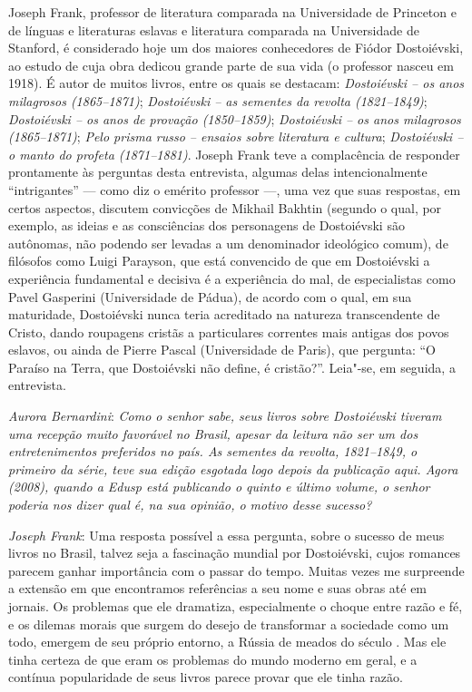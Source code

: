 



Joseph Frank, professor de literatura comparada na Universidade de
Princeton e de línguas e literaturas eslavas e literatura comparada na
Universidade de Stanford, é considerado hoje um dos maiores conhecedores
de Fiódor Dostoiévski, ao estudo de cuja obra dedicou grande parte de
sua vida (o professor nasceu em 1918). É autor de muitos livros, entre
os quais se destacam: \emph{Dostoiévski -- os anos milagrosos (1865--1871)}; \emph{Dostoiévski -- as sementes da revolta (1821--1849)}; \emph{Dostoiévski -- os anos de provação
(1850--1859)}; \emph{Dostoiévski -- os anos
milagrosos (1865--1871)}; \emph{Pelo prisma russo -- ensaios sobre literatura e cultura}; \emph{Dostoiévski -- o manto do
profeta (1871--1881)}. Joseph
Frank teve a complacência de responder prontamente às perguntas desta
entrevista, algumas delas intencionalmente ``intrigantes'' --- como diz o
emérito professor ---, uma vez que suas respostas, em certos aspectos,
discutem convicções de Mikhail Bakhtin (segundo o qual, por exemplo, as
ideias e as consciências dos personagens de Dostoiévski são autônomas,
não podendo ser levadas a um denominador ideológico comum), de filósofos
como Luigi Parayson, que está convencido de que em Dostoiévski a
experiência fundamental e decisiva é a experiência do mal, de
especialistas como Pavel Gasperini (Universidade de Pádua), de acordo
com o qual, em sua maturidade, Dostoiévski nunca teria acreditado na
natureza transcendente de Cristo, dando roupagens cristãs a particulares
correntes mais antigas dos povos eslavos, ou ainda de Pierre Pascal
(Universidade de Paris), que pergunta: ``O Paraíso na Terra, que
Dostoiévski não define, é cristão?''. Leia"-se, em seguida, a entrevista.

\medskip

\noindent
\emph{Aurora Bernardini}: \emph{Como o senhor sabe, seus livros sobre Dostoiévski tiveram
uma recepção muito favorável no Brasil, apesar da leitura não ser um
dos entretenimentos preferidos no país. \emph{As sementes da revolta,
1821--1849}, o primeiro da série, teve sua edição esgotada logo depois da
publicação aqui. Agora (2008), quando a Edusp está publicando o quinto e último
volume, o senhor poderia nos dizer qual é, na sua opinião, o motivo
desse sucesso?}


\noindent
\emph{Joseph Frank}: Uma resposta possível a essa pergunta, sobre o
sucesso de meus livros no Brasil, talvez seja a fascinação mundial por
Dostoiévski, cujos romances parecem ganhar importância com o passar do
tempo. Muitas vezes me surpreende a extensão em que encontramos
referências a seu nome e suas obras até em jornais. Os problemas que ele
dramatiza, especialmente o choque entre razão e fé, e os dilemas morais
que surgem do desejo de transformar a sociedade como um todo,
emergem de seu próprio entorno, a Rússia de meados do século . Mas ele
tinha certeza de que eram os problemas do mundo moderno em geral, e a
contínua popularidade de seus livros parece provar que ele tinha razão.

